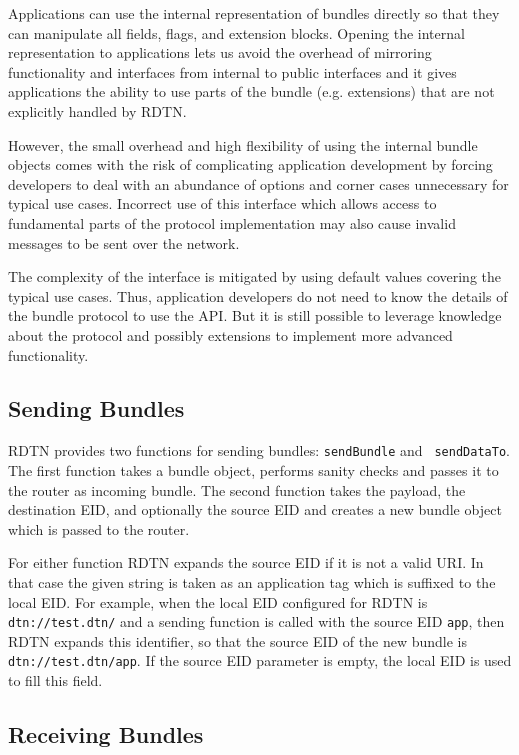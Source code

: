 \documentclass{article}
\begin{document}
Applications can use the internal representation of bundles directly so that
they can manipulate all fields, flags, and extension blocks. Opening the
internal representation to applications lets us avoid the overhead of mirroring
functionality and interfaces from internal to public interfaces and it gives
applications the ability to use parts of the bundle (e.g. extensions) that are
not explicitly handled by RDTN.

However, the small overhead and high flexibility of using the internal bundle
objects comes with the risk of complicating application development by forcing
developers to deal with an abundance of options and corner cases unnecessary for
typical use cases. Incorrect use of this interface which allows access to
fundamental parts of the protocol implementation may also cause invalid messages
to be sent over the network.

The complexity of the interface is mitigated by using default values covering the
typical use cases. Thus, application developers do not need to know the details
of the bundle protocol to use the API. But it is still possible to leverage
knowledge about the protocol and possibly extensions to implement more advanced
functionality.

\subsection{Sending Bundles}\label{sec.sending}

RDTN provides two functions for sending bundles: {\tt sendBundle} and {\tt
sendDataTo}. The first function takes a bundle object, performs sanity checks
and passes it to the router as incoming bundle. The second function takes the
payload, the destination EID, and optionally the source EID and creates a new
bundle object which is passed to the router.

For either function RDTN expands the source EID if it is not a valid URI. In
that case the given string is taken as an application tag which is suffixed to
the local EID. For example, when the local EID configured for RDTN is {\tt
dtn://test.dtn/} and a sending function is called with the source EID {\tt app},
then RDTN expands this identifier, so that the source EID of the new bundle is
{\tt dtn://test.dtn/app}. If the source EID parameter is empty, the local EID is
used to fill this field.

\subsection{Receiving Bundles}\label{sec.receiving}
\end{document}
